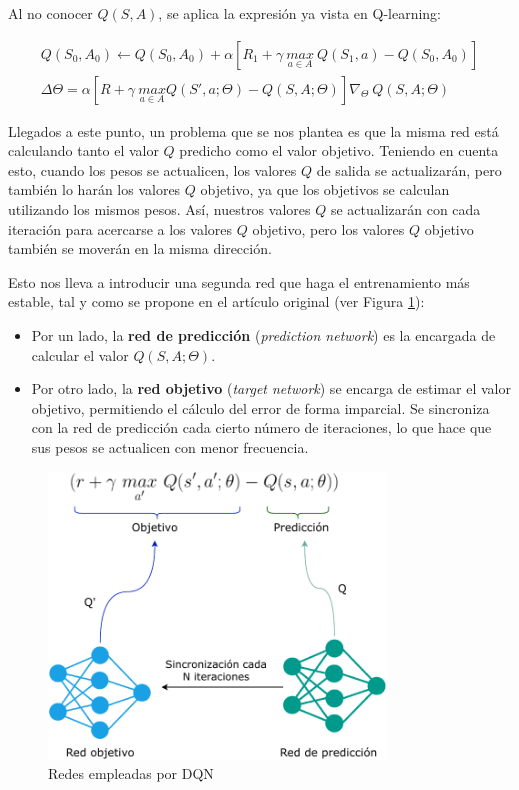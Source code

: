 Al no conocer $Q(S,A)$, se aplica la expresión ya vista en Q-learning:

\begin{gather}
    Q(S_0,A_0) \leftarrow Q(S_0,A_0) + \alpha[R_1 + \gamma \ \underset{a \in A}{max} \ Q(S_1,a) - Q(S_0, A_0)] \\
    \Delta \Theta = \alpha [R + \gamma \ \underset{a \in A}{max} Q(S',a;\Theta)-Q(S,A;\Theta)] \nabla_\Theta \ Q(S,A;\Theta)
\end{gather}

Llegados a este punto, un problema que se nos plantea es que la misma red está calculando tanto el valor $Q$ predicho como el valor objetivo. Teniendo en cuenta esto, cuando los pesos se actualicen, los valores $Q$ de salida se actualizarán, pero también lo harán los valores $Q$ objetivo, ya que los objetivos se calculan utilizando los mismos pesos. Así, nuestros valores $Q$ se actualizarán con cada iteración para acercarse a los valores $Q$ objetivo, pero los valores $Q$ objetivo también se moverán en la misma dirección. 

Esto nos lleva a introducir una segunda red que haga el entrenamiento más estable, tal y como se propone en el artículo original \cite{mnih2015human} (ver Figura \ref{fig:dqn-nets}):

\begin{itemize}
    \item Por un lado, la \textbf{red de predicción} (\textit{prediction network}) es la encargada de calcular el valor $Q(S,A;\Theta)$.
    \item Por otro lado, la \textbf{red objetivo} (\textit{target network}) se encarga de estimar el valor objetivo, permitiendo el cálculo del error de forma imparcial. Se sincroniza con la red de predicción cada cierto número de iteraciones, lo que hace que sus pesos se actualicen con menor frecuencia.
\end{itemize}

\begin{figure}
    \centering
    \includegraphics[width=0.8\textwidth]{imagenes/dqn-nets.pdf}
    \caption{Redes empleadas por DQN}
    \label{fig:dqn-nets}
\end{figure}

